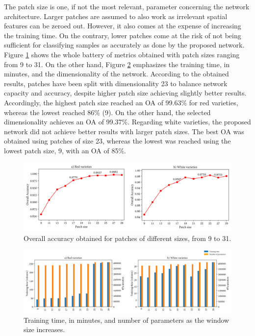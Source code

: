The patch size is one, if not the most relevant, parameter concerning the network architecture. Larger patches are assumed to also work as irrelevant spatial features can be zeroed out. However, it also comes at the expense of increasing the training time. On the contrary, lower patches come at the risk of not being sufficient for classifying samples as accurately as done by the proposed network. Figure \ref{fig:window_size_test} shows the whole battery of metrics obtained with patch sizes ranging from 9 to 31. On the other hand, Figure \ref{fig:time_capacity_test} emphasizes the training time, in minutes, and the dimensionality of the network. According to the obtained results, patches have been split with dimensionality 23 to balance network capacity and accuracy, despite higher patch size achieving slightly better results. Accordingly, the highest patch size reached an OA of 99.63\% for red varieties, whereas the lowest reached 86\% (9). On the other hand, the selected dimensionality achieves an OA of 99.37\%. Regarding white varieties, the proposed network did not achieve better results with larger patch sizes. The best OA was obtained using patches of size 23, whereas the lowest was reached using the lowest patch size, 9, with an OA of 85\%.

\begin{figure}[ht]
    \centering
    \includegraphics[width=\linewidth]{figs/vineyard_classification/window_size_test.png}
	\caption{Overall accuracy obtained for patches of different sizes, from 9 to 31. }
	\label{fig:window_size_test}
\end{figure}

\begin{figure}[ht]
    \centering
    \includegraphics[width=\linewidth]{figs/vineyard_classification/time_capacity.png}
	\caption{Training time, in minutes, and number of parameters as the window size increases. }
	\label{fig:time_capacity_test}
\end{figure}

